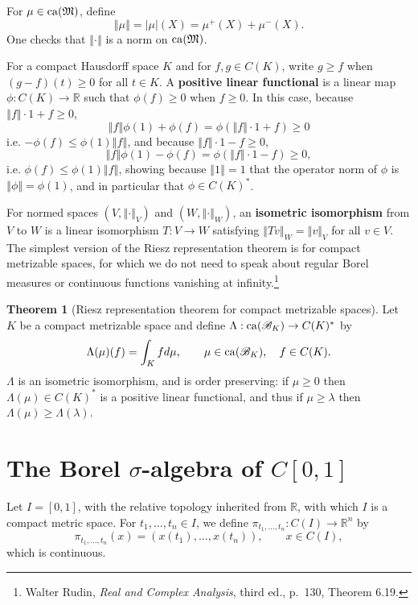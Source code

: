 \documentclass{article}
\newcommand{\ca}{\ensuremath\mathrm{ca}}
\newcommand{\norm}[1]{\left\Vert #1 \right\Vert}
\theoremstyle{definition}
\newtheorem{theorem}{Theorem}
\theoremstyle{definition}
\begin{document}
For $\mu \in \ca(\mathfrak{M})$,
 define
\[
\norm{\mu} = |\mu|(X) = \mu^+(X) + \mu^-(X).
\]
One checks that $\norm{\cdot}$ is a norm on $\ca(\mathfrak{M})$.

For a compact Hausdorff space $K$ and
for $f,g \in C(K)$, write $g \geq f$ when $(g-f)(t) \geq 0$ for all $t \in K$. A \textbf{positive linear functional} is a linear map $\phi:C(K) \to \mathbb{R}$ such that
$\phi(f) \geq 0$ when $f \geq 0$. In this case, because $\norm{f}\cdot 1+f \geq 0$,
\[
\norm{f}\phi(1)+\phi(f) = \phi(\norm{f}\cdot 1 + f) \geq 0
\]
i.e. $-\phi(f) \leq \phi(1) \norm{f}$,
and 
because $\norm{f} \cdot 1 - f \geq 0$,
\[
\norm{f}\phi(1)-\phi(f) = \phi(\norm{f}\cdot 1 - f) \geq 0,
\]
i.e. $\phi(f) \leq \phi(1) \norm{f}$, showing because $\norm{1}=1$ that the operator norm of $\phi$ is
$\norm{\phi} = \phi(1)$, and in particular that $\phi \in C(K)^*$. 
 
 For normed spaces $(V,\norm{\cdot}_V)$ and $(W,\norm{\cdot}_W)$, an \textbf{isometric
 isomorphism} from $V$ to $W$ is a linear isomorphism $T:V \to W$ satisfying $\norm{Tv}_W = 
 \norm{v}_V$ for all $v \in V$. The simplest version of the Riesz representation theorem is for compact
 metrizable spaces, for which we do not need to speak about regular Borel measures or continuous functions vanishing at infinity.\footnote{Walter
 Rudin, {\em Real and Complex Analysis}, third ed., p.~130, Theorem 6.19.}


\begin{theorem}[Riesz representation theorem for compact metrizable spaces]
Let $K$ be a compact metrizable space and define $\Lambda:\ca(\mathscr{B}_K) \to C(K)^*$ by 
\[
\Lambda(\mu)(f) = \int_K f d\mu,\qquad \mu \in \ca(\mathscr{B}_K),\quad f \in C(K).
\]
$\Lambda$ is an isometric isomorphism, and is order preserving: if $\mu \geq 0$ then $\Lambda(\mu) \in C(K)^*$ is a positive linear functional, and thus
if $\mu \geq \lambda$ then $\Lambda(\mu) \geq \Lambda(\lambda)$. 
\end{theorem}




\section{The Borel $\sigma$-algebra of $C[0,1]$}
Let $I=[0,1]$, with the relative topology inherited from $\mathbb{R}$, with which $I$ is a compact metric space.
For $t_1,\ldots,t_n \in I$, we define $\pi_{t_1,\ldots,t_n}:C(I) \to \mathbb{R}^n$ by
\[
\pi_{t_1,\ldots,t_n}(x)=(x(t_1),\ldots,x(t_n)), \qquad x \in C(I),
\]
which is continuous.
\end{document}
